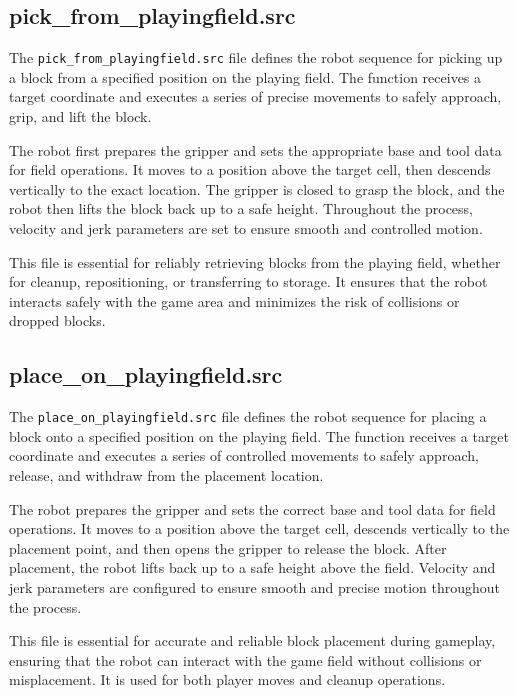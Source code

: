 \documentclass{article}
\begin{document}
        \subsection{pick\_from\_playingfield.src}
            The \texttt{pick\_from\_playingfield.src} file defines the robot sequence for picking up a block from a specified position on the playing field. The function receives a target coordinate and executes a series of precise movements to safely approach, grip, and lift the block.

            The robot first prepares the gripper and sets the appropriate base and tool data for field operations. It moves to a position above the target cell, then descends vertically to the exact location. The gripper is closed to grasp the block, and the robot then lifts the block back up to a safe height. Throughout the process, velocity and jerk parameters are set to ensure smooth and controlled motion.

            This file is essential for reliably retrieving blocks from the playing field, whether for cleanup, repositioning, or transferring to storage. It ensures that the robot interacts safely with the game area and minimizes the risk of collisions or dropped blocks.

        \subsection{place\_on\_playingfield.src}
            The \texttt{place\_on\_playingfield.src} file defines the robot sequence for placing a block onto a specified position on the playing field. The function receives a target coordinate and executes a series of controlled movements to safely approach, release, and withdraw from the placement location.

            The robot prepares the gripper and sets the correct base and tool data for field operations. It moves to a position above the target cell, descends vertically to the placement point, and then opens the gripper to release the block. After placement, the robot lifts back up to a safe height above the field. Velocity and jerk parameters are configured to ensure smooth and precise motion throughout the process.

            This file is essential for accurate and reliable block placement during gameplay, ensuring that the robot can interact with the game field without collisions or misplacement. It is used for both player moves and cleanup operations.
\end{document}

